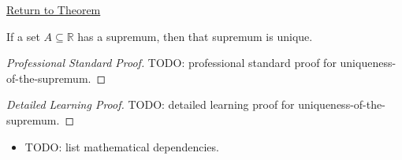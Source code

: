 \newpage
{}
\label{prf:uniqueness-of-the-supremum}

\begin{remark*}[Return]
\hyperref[prop:uniqueness-of-the-supremum]{Return to Theorem}
\end{remark*}

\begin{proposition*}
If a set $A \subseteq \mathbb{R}$ has a supremum, then that supremum is unique.
\end{proposition*}

\begin{proof}[Professional Standard Proof]
\LRAProofBodyStart
TODO: professional standard proof for uniqueness-of-the-supremum.
\end{proof}

\begin{proof}[Detailed Learning Proof]
\LRAProofBodyStart
TODO: detailed learning proof for uniqueness-of-the-supremum.
\end{proof}

\begin{remark*}
\end{remark*}

\begin{dependencies}
\begin{itemize}
  \item TODO: list mathematical dependencies.
\end{itemize}
\end{dependencies}

\clearpage
